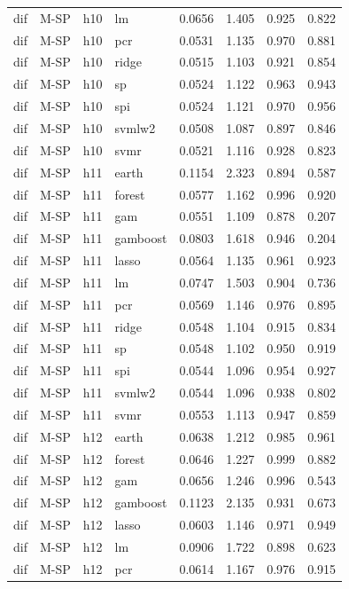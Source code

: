 \begin{ThreePartTable}
\begin{longtable}[t]{llclcccc}
dif & M-SP & h10 & lm & 0.0656 & 1.405 & 0.925 & 0.822\\
dif & M-SP & h10 & pcr & 0.0531 & 1.135 & 0.970 & 0.881\\
dif & M-SP & h10 & ridge & 0.0515 & 1.103 & 0.921 & 0.854\\
dif & M-SP & h10 & sp & 0.0524 & 1.122 & 0.963 & 0.943\\
dif & M-SP & h10 & spi & 0.0524 & 1.121 & 0.970 & 0.956\\
dif & M-SP & h10 & svmlw2 & 0.0508 & 1.087 & 0.897 & 0.846\\
dif & M-SP & h10 & svmr & 0.0521 & 1.116 & 0.928 & 0.823\\
\addlinespace
dif & M-SP & h11 & earth & 0.1154 & 2.323 & 0.894 & 0.587\\
dif & M-SP & h11 & forest & 0.0577 & 1.162 & 0.996 & 0.920\\
dif & M-SP & h11 & gam & 0.0551 & 1.109 & 0.878 & 0.207\\
dif & M-SP & h11 & gamboost & 0.0803 & 1.618 & 0.946 & 0.204\\
dif & M-SP & h11 & lasso & 0.0564 & 1.135 & 0.961 & 0.923\\
dif & M-SP & h11 & lm & 0.0747 & 1.503 & 0.904 & 0.736\\
dif & M-SP & h11 & pcr & 0.0569 & 1.146 & 0.976 & 0.895\\
dif & M-SP & h11 & ridge & 0.0548 & 1.104 & 0.915 & 0.834\\
dif & M-SP & h11 & sp & 0.0548 & 1.102 & 0.950 & 0.919\\
dif & M-SP & h11 & spi & 0.0544 & 1.096 & 0.954 & 0.927\\
dif & M-SP & h11 & svmlw2 & 0.0544 & 1.096 & 0.938 & 0.802\\
dif & M-SP & h11 & svmr & 0.0553 & 1.113 & 0.947 & 0.859\\
\addlinespace
dif & M-SP & h12 & earth & 0.0638 & 1.212 & 0.985 & 0.961\\
dif & M-SP & h12 & forest & 0.0646 & 1.227 & 0.999 & 0.882\\
dif & M-SP & h12 & gam & 0.0656 & 1.246 & 0.996 & 0.543\\
dif & M-SP & h12 & gamboost & 0.1123 & 2.135 & 0.931 & 0.673\\
dif & M-SP & h12 & lasso & 0.0603 & 1.146 & 0.971 & 0.949\\
dif & M-SP & h12 & lm & 0.0906 & 1.722 & 0.898 & 0.623\\
dif & M-SP & h12 & pcr & 0.0614 & 1.167 & 0.976 & 0.915\\

\end{longtable}
\end{ThreePartTable}
